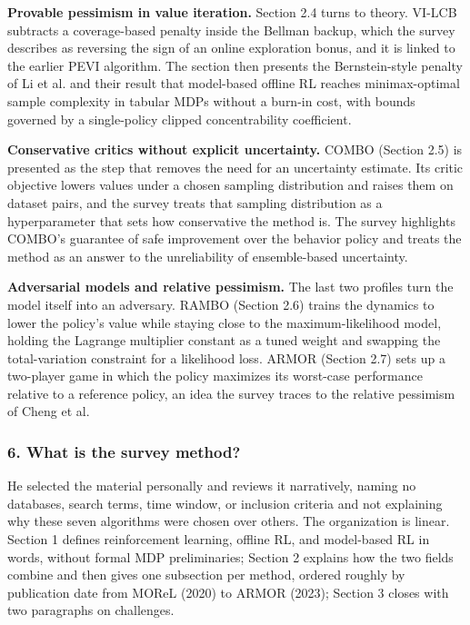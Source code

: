 \documentclass[11pt]{article}
\newcommand{\question}[1]{\subsubsection*{#1}}
\begin{document}
\textbf{Provable pessimism in value iteration.} Section 2.4 turns to theory. VI-LCB subtracts a coverage-based penalty inside the Bellman backup, which the survey describes as reversing the sign of an online exploration bonus, and it is linked to the earlier PEVI algorithm. The section then presents the Bernstein-style penalty of Li et al. and their result that model-based offline RL reaches minimax-optimal sample complexity in tabular MDPs without a burn-in cost, with bounds governed by a single-policy clipped concentrability coefficient.

\textbf{Conservative critics without explicit uncertainty.} COMBO (Section 2.5) is presented as the step that removes the need for an uncertainty estimate. Its critic objective lowers values under a chosen sampling distribution and raises them on dataset pairs, and the survey treats that sampling distribution as a hyperparameter that sets how conservative the method is. The survey highlights COMBO's guarantee of safe improvement over the behavior policy and treats the method as an answer to the unreliability of ensemble-based uncertainty.

\textbf{Adversarial models and relative pessimism.} The last two profiles turn the model itself into an adversary. RAMBO (Section 2.6) trains the dynamics to lower the policy's value while staying close to the maximum-likelihood model, holding the Lagrange multiplier constant as a tuned weight and swapping the total-variation constraint for a likelihood loss. ARMOR (Section 2.7) sets up a two-player game in which the policy maximizes its worst-case performance relative to a reference policy, an idea the survey traces to the relative pessimism of Cheng et al.

\question{6. What is the survey method?}

He selected the material personally and reviews it narratively, naming no databases, search terms, time window, or inclusion criteria and not explaining why these seven algorithms were chosen over others. The organization is linear. Section 1 defines reinforcement learning, offline RL, and model-based RL in words, without formal MDP preliminaries; Section 2 explains how the two fields combine and then gives one subsection per method, ordered roughly by publication date from MOReL (2020) to ARMOR (2023); Section 3 closes with two paragraphs on challenges.
\end{document}
